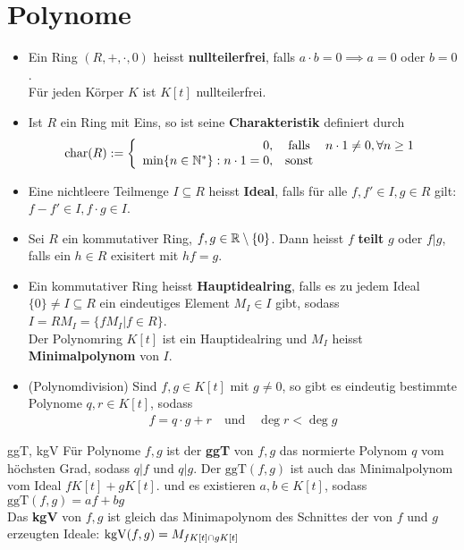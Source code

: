 
\section{Polynome}
\begin{itemize}
    \item   Ein Ring $(R,+,\cdot,0)$ heisst \textbf{nullteilerfrei}, falls $a \cdot b = 0 \implies a = 0$ oder $b = 0$.\\
    Für jeden Körper $K$ ist $K[t]$ nullteilerfrei.
    \item   Ist $R$ ein Ring mit Eins, so ist seine \textbf{Charakteristik} definiert durch
    \begin{align*}
        \text{char}(R) := \left\{ \begin{array}{rcl}
            0, &\text{falls}& n \cdot 1 \neq 0, \forall n \geq 1\\
            \min\{n \in \mathbb{N}^*\}: n \cdot 1 = 0, &\text{sonst}
        \end{array} \right.
    \end{align*}
    \item   Eine nichtleere Teilmenge $I \subseteq R$ heisst \textbf{Ideal}, falls für alle $f, f' \in I, g \in R$ gilt: $f - f' \in I, f \cdot g \in I$.
    \item   Sei $R$ ein kommutativer Ring, $f,g \in \mathbb{R} \setminus \{0\}$. Dann heisst $f$ \textbf{teilt} $g$ oder $f | g$, falls ein $h \in R$ exisitert mit $hf = g$.
    \item   Ein kommutativer Ring heisst \textbf{Hauptidealring}, falls es zu jedem Ideal $\{0\} \neq I \subseteq R$ ein eindeutiges Element $M_I \in I$ gibt, sodass $I = R M_I = \{fM_I \big\vert f \in R\}$.\\
    Der Polynomring $K[t]$ ist ein Hauptidealring und $M_I$ heisst \textbf{Minimalpolynom} von $I$.
    \item   (Polynomdivision)
    Sind $f,g \in K[t]$ mit $g \neq 0$, so gibt es eindeutig bestimmte Polynome $q,r \in K[t]$, sodass
    \begin{align*}
        f = q \cdot g + r \quad \text{und} \quad \deg r < \deg g
    \end{align*}
\end{itemize}



\begin{definition}{ggT, kgV}
    Für Polynome $f,g$ ist der \textbf{ggT} von $f,g$ das normierte Polynom $q$ vom höchsten Grad, sodass $q|f$ und $q|g$. Der $\text{ggT}(f,g)$ ist auch das Minimalpolynom vom Ideal $fK[t] + gK[t]$. und es existieren $a,b \in K[t]$, sodass $\text{ggT}(f,g) = af + bg$\\
    Das \textbf{kgV} von $f,g$ ist gleich das Minimapolynom des Schnittes der von $f$ und $g$ erzeugten Ideale: $\operatorname{kgV}(f,g) = M_{fK[t] \cap gK[t]}$
\end{definition}

